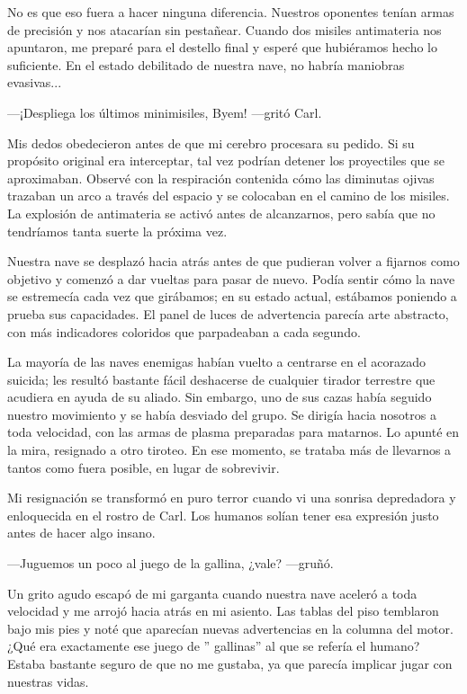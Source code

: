 No es que eso fuera a hacer ninguna diferencia. Nuestros oponentes tenían armas de precisión y nos atacarían sin pestañear. Cuando dos misiles antimateria nos apuntaron, me preparé para el destello final y esperé que hubiéramos hecho lo suficiente. En el estado debilitado de nuestra nave, no habría maniobras evasivas...

—¡Despliega los últimos minimisiles, Byem! —gritó Carl.

Mis dedos obedecieron antes de que mi cerebro procesara su pedido. Si su propósito original era interceptar, tal vez podrían detener los proyectiles que se aproximaban. Observé con la respiración contenida cómo las diminutas ojivas trazaban un arco a través del espacio y se colocaban en el camino de los misiles. La explosión de antimateria se activó antes de alcanzarnos, pero sabía que no tendríamos tanta suerte la próxima vez.

Nuestra nave se desplazó hacia atrás antes de que pudieran volver a fijarnos como objetivo y comenzó a dar vueltas para pasar de nuevo. Podía sentir cómo la nave se estremecía cada vez que girábamos; en su estado actual, estábamos poniendo a prueba sus capacidades. El panel de luces de advertencia parecía arte abstracto, con más indicadores coloridos que parpadeaban a cada segundo.

La mayoría de las naves enemigas habían vuelto a centrarse en el acorazado suicida; les resultó bastante fácil deshacerse de cualquier tirador terrestre que acudiera en ayuda de su aliado. Sin embargo, uno de sus cazas había seguido nuestro movimiento y se había desviado del grupo. Se dirigía hacia nosotros a toda velocidad, con las armas de plasma preparadas para matarnos. Lo apunté en la mira, resignado a otro tiroteo. En ese momento, se trataba más de llevarnos a tantos como fuera posible, en lugar de sobrevivir.

Mi resignación se transformó en puro terror cuando vi una sonrisa depredadora y enloquecida en el rostro de Carl. Los humanos solían tener esa expresión justo antes de hacer algo insano.

—Juguemos un poco al juego de la gallina, ¿vale? —gruñó.

Un grito agudo escapó de mi garganta cuando nuestra nave aceleró a toda velocidad y me arrojó hacia atrás en mi asiento. Las tablas del piso temblaron bajo mis pies y noté que aparecían nuevas advertencias en la columna del motor. ¿Qué era exactamente ese juego de ''
gallinas''
 al que se refería el humano? Estaba bastante seguro de que no me gustaba, ya que parecía implicar jugar con nuestras vidas.

